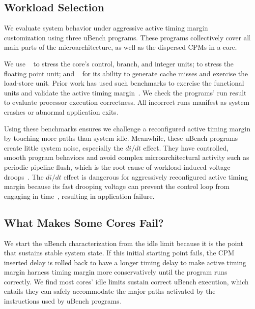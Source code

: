 \subsection{Workload Selection}
\label{sec:process:ubench_benchmarks}

We evaluate system behavior under aggressive active timing margin customization using three uBench programs. These programs collectively cover all main parts of the microarchitecture, as well as the dispersed CPMs in a core. 

We use ~\cite{coremark} to stress the core's control, branch, and integer units;  to stress the floating point unit; and ~\cite{stream} for its ability to generate cache misses and exercise the load-store unit. Prior work has used such benchmarks to exercise the functional units and validate the active timing margin~\cite{lefurgy2011active, lefurgy2013active}. We check the programs' run result to evaluate processor execution correctness. All incorrect runs manifest as system crashes or abnormal application exits.

Using these benchmarks ensures we challenge a reconfigured active timing margin by touching more paths than system idle. Meanwhile, these uBench programs create little system noise, especially the $di/dt$ effect. They have controlled, smooth program behaviors and avoid complex microarchitectural activity such as periodic pipeline flush, which is the root cause of workload-induced voltage droops~\cite{grochowski2002microarchitectural,powell2003pipeline,reddi2009voltage,reddi2010voltage,miller2012vrsync}. The $di/dt$ effect is dangerous for aggressively reconfigured active timing margin because its fast drooping voltage can prevent the control loop from engaging in time~\cite{vezyrtzis2018droop}, resulting in application failure. 

\subsection{What Makes Some Cores Fail?}
\label{sec:process:ubench_profiling}

We start the uBench characterization from the idle limit because it is the point that sustains stable system state. If this initial starting point fails, the CPM inserted delay is rolled back to have a longer timing delay to make active timing margin harness timing margin more conservatively until the program runs correctly. We find most cores' idle limits sustain correct uBench execution, which entails they can safely accommodate the major paths activated by the instructions used by uBench programs. 


